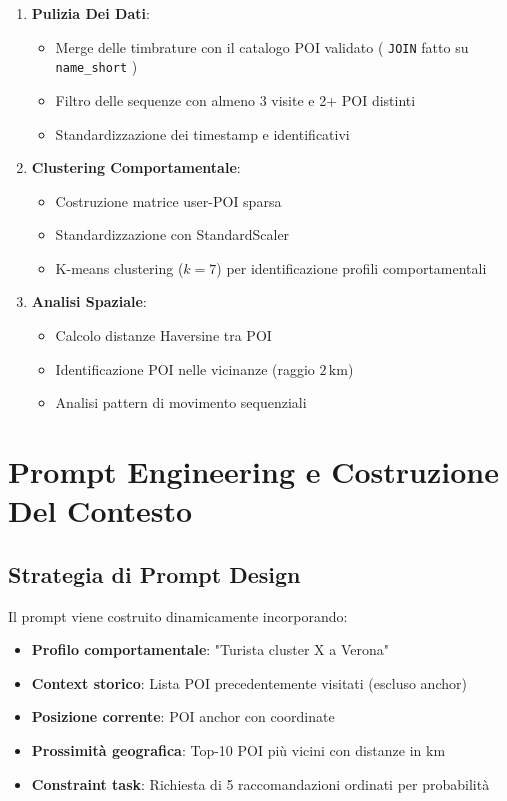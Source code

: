 \begin{enumerate}
\item \textbf{Pulizia Dei Dati}: 
   \begin{itemize}
   \item Merge delle timbrature con il catalogo POI validato ( \texttt{JOIN} fatto su \texttt{name\_short} )
   \item Filtro delle sequenze con almeno 3 visite e 2+ POI distinti
   \item Standardizzazione dei timestamp e identificativi
   \end{itemize}

\item \textbf{Clustering Comportamentale}:
   \begin{itemize}
   \item Costruzione matrice user-POI sparsa
   \item Standardizzazione con StandardScaler
   \item K-means clustering ($k=7$) per identificazione profili comportamentali
   \end{itemize}

\item \textbf{Analisi Spaziale}:
   \begin{itemize}
   \item Calcolo distanze Haversine tra POI
   \item Identificazione POI nelle vicinanze (raggio $2\,\mathrm{km}$)
   \item Analisi pattern di movimento sequenziali
   \end{itemize}
\end{enumerate}

\section{Prompt Engineering e Costruzione Del Contesto}

\subsection{Strategia di Prompt Design}

Il prompt viene costruito dinamicamente incorporando:

\begin{itemize}
\item \textbf{Profilo comportamentale}: "Turista cluster X a Verona"
\item \textbf{Context storico}: Lista POI precedentemente visitati (escluso anchor)  
\item \textbf{Posizione corrente}: POI anchor con coordinate
\item \textbf{Prossimità geografica}: Top-10 POI più vicini con distanze in km
\item \textbf{Constraint task}: Richiesta di 5 raccomandazioni ordinati per probabilità
\end{itemize}


